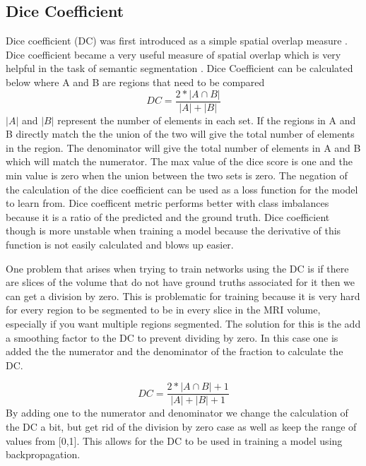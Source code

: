 \subsection{Dice Coefficient}
    Dice coefficient (DC) was first introduced as a simple spatial overlap measure \cite{10.2307/1932409dice}. 
    Dice coefficient became a very useful measure of spatial overlap which is very helpful in the task of semantic segmentation \cite{dice2004}. 
    Dice Coefficient can be calculated below where A and B are regions that need to be compared
\begin{equation}
 DC = \frac{2*|A \cap B|}{|A| + |B|}\label{eq:dicescore} 
\end{equation}
    $|A|$ and $|B|$ represent the number of elements in each set. 
    If the regions in A and B directly match the the union of the two will give the total number of elements in the region. 
    The denominator will give the total number of elements in A and B which will match the numerator. 
    The max value of the dice score is one and the min value is zero when the union between the two sets is zero. 
    The negation of the calculation of the dice coefficient can be used as a loss function for the model to learn from. 
    Dice coefficent metric performs better with class imbalances because it is a ratio of the predicted and the ground truth. 
    Dice coefficient though is more unstable when training a model because the derivative of this function is not easily calculated and blows up easier.
    
    One problem that arises when trying to train networks using the DC is if there are slices of the volume that do not have ground truths associated for it then we can get a division by zero. 
    This is problematic for training because it is very hard for every region to be segmented to be in every slice in the MRI volume, especially if you want multiple regions segmented. 
    The solution for this is the add a smoothing factor to the DC to prevent dividing by zero. 
    In this case one is added the the numerator and the denominator of the fraction to calculate the DC.
    
    \begin{equation}
 DC = \frac{2*|A \cap B| + 1}{|A| + |B| + 1}\label{eq:dicescoreloss} 
\end{equation}
    By adding one to the numerator and denominator we change the calculation of the DC a bit, but get rid of the division by zero case as well as keep the range of values from [0,1]. 
    This allows for the DC to be used in training a model using backpropagation. 
    

